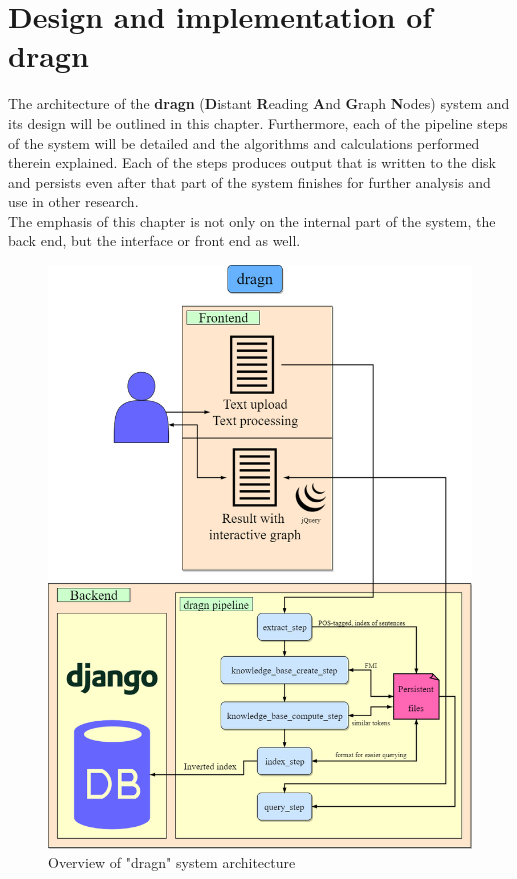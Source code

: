\chapter{Design and implementation of dragn}\label{prototype}
The architecture of the \textbf{dragn} (\textbf{D}istant \textbf{R}eading \textbf{A}nd \textbf{G}raph \textbf{N}odes) system and its design will be outlined in this chapter. Furthermore, each of the pipeline steps of the system will be detailed and the algorithms and calculations performed therein explained. Each of the steps produces output that is written to the disk and persists even after that part of the system finishes for further analysis and use in other research.\\
The emphasis of this chapter is not only on the internal part of the system, the back end, but the interface or front end as well.\\
\begin{figure}[H]
    \centering
    \includegraphics[scale=0.53]{fig/dragn_structure1_1}
    \caption{Overview of "dragn" system architecture}
    \label{fig:dragn_overview}
\end{figure}

